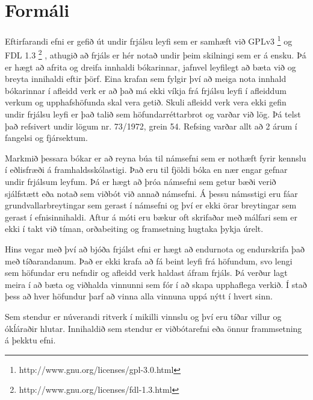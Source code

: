 \section*{Formáli}
Eftirfarandi efni er gefið út undir frjálsu leyfi sem er samhæft við
GPLv3%
\footnote{http://www.gnu.org/licenses/gpl-3.0.html}%
og FDL 1.3%
\footnote{http://www.gnu.org/licenses/fdl-1.3.html}%
, athugið að frjáls er hér notað undir þeim skilningi sem
er á ensku. Þá er hægt að afrita og dreifa innhaldi bókarinnar, jafnvel
leyfilegt að bæta við og breyta innihaldi eftir þörf. Eina krafan sem
fylgir því að meiga nota innhald bókarinnar í afleidd verk er að það má
ekki víkja frá frjálsu leyfi í afleiddum verkum og upphafshöfunda skal
vera getið. Skuli afleidd verk vera ekki gefin undir frjálsu leyfi er
það talið sem höfundarréttarbrot og varðar við lög. Þá telst það
refsivert undir lögum nr. 73/1972, grein 54. Refsing varðar allt að
2 árum í fangelsi og fjársektum.

Markmið þessara bókar er að reyna búa til námsefni sem er nothæft
fyrir kennslu í eðlisfræði á framhaldsskólastigi. Það eru til
fjöldi bóka en nær engar gefnar undir frjálsum leyfum. Þá er hægt
að þróa námsefni sem getur bæði verið sjálfstætt eða notað sem
viðbót við annað námsefni. Á þessu námsstigi eru fáar 
grundvallarbreytingar sem gerast í námsefni og því er ekki örar
breytingar sem gerast í efnisinnihaldi. Aftur á móti eru
bækur oft skrifaðar með málfari sem er ekki í takt við tíman,
orðabeiting og framsetning hugtaka þykja úrelt.

Hins vegar með því að bjóða frjálst efni er hægt að endurnota og
endurskrifa það með tíðarandanum. Það er ekki krafa að fá beint
leyfi frá höfundum, svo lengi sem höfundar eru nefndir og afleidd verk
haldast áfram frjáls. Þá verður lagt meira í að bæta og viðhalda
vinnunni sem fór í að skapa upphaflega verkið. Í stað þess að
hver höfundur þarf að vinna alla vinnuna uppá nýtt í hvert sinn.

Sem stendur er núverandi ritverk í mikilli vinnslu og því eru tíðar
villur og ókĺáraðir hlutar. Innihaldið sem stendur er viðbótarefni
eða önnur frammsetning á þekktu efni.
